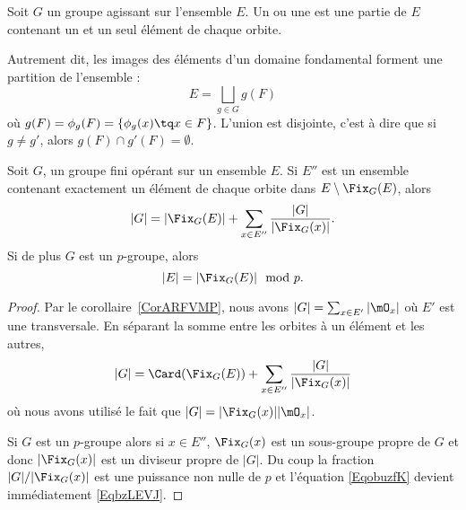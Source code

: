 \begin{definition}  \label{DefcSuYxz}
    Soit \( G\) un groupe agissant sur l'ensemble \( E\). Un  ou une  est une partie de \( E\) contenant un et un seul élément de chaque orbite.
\end{definition}
Autrement dit, les images des éléments d'un domaine fondamental forment une partition de l'ensemble :
\begin{equation}
    E=\bigsqcup_{g\in G}g(F)
\end{equation}
où  \( g(F) = \phi_g(F) = \{ \phi_g(x) \tq x \in F\} \). L'union est disjointe, c'est à dire que si \( g\neq g'\), alors \( g(F)\cap g'(F)=\emptyset\).




\begin{proposition}     \label{PropUyLPdp}
    Soit \( G\), un groupe fini opérant sur un ensemble \( E\). Si \( E''\) est un ensemble contenant exactement un élément de chaque orbite dans \( E\setminus\Fix_G(E)\), alors
    \begin{equation}        \label{EqobuzfK}
        | G |=| \Fix_G(E) |+\sum_{x\in E''}\frac{ | G | }{ | \Fix_G(x) | }.
    \end{equation}
    Si de plus \( G\) est un $p$-groupe, alors
    \begin{equation}    \label{EqbzLEVJ}
        | E |=| \Fix_G(E) |\mod p.
    \end{equation}
\end{proposition}

\begin{proof}
    Par le corollaire~\ref{CorARFVMP}, nous avons \( | G |=\sum_{x\in E'}| \mO_x |\) où \( E'\) est une transversale.  En séparant la somme entre les orbites à un élément et les autres,
    \begin{equation}    \label{EqeggkBs}
        | G |=\Card(\Fix_G(E))+\sum_{x\in E''}\frac{ | G | }{ | \Fix_G(x) | }
    \end{equation}  \label{EqDgYbhm}
    où nous avons utilisé le fait que \( | G |=| \Fix_G(x) | |\mO_x |\).

    Si \( G\) est un \( p\)-groupe alors si \( x\in E''\), \( \Fix_G(x)\) est un sous-groupe propre de \( G\) et donc \( | \Fix_G(x) |\) est un diviseur propre de \( | G |\). Du coup la fraction \( | G |/|\Fix_G(x)|\) est une puissance non nulle de \( p\) et l'équation \eqref{EqobuzfK} devient immédiatement \eqref{EqbzLEVJ}.
\end{proof}


